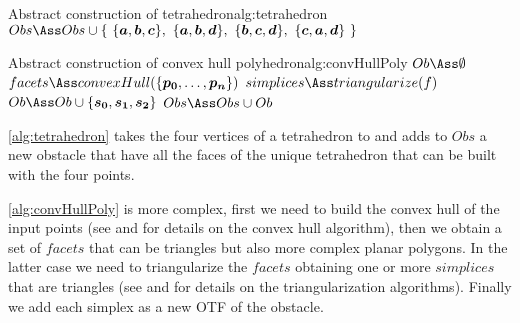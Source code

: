 \documentclass[dissertation.tex]{subfiles}
\begin{document}
\begin{algo}{Abstract construction of tetrahedron}{alg:tetrahedron}
  \State $Obs\Ass Obs\cup\{\ \{\ve{a},\ve{b},\ve{c}\},\ \{\ve{a},\ve{b},\ve{d}\},\ \{\ve{b},\ve{c},\ve{d}\},\ \{\ve{c},\ve{a},\ve{d}\}\ \}$
  \EndProcedure
\end{algo}
\begin{algo}{Abstract construction of convex hull
    polyhedron}{alg:convHullPoly}
  \State $Ob\Ass\emptyset$
  \State $facets\Ass convexHull(\{\ve{p_0},\dots,\ve{p_n}\})$
  \State $simplices\Ass triangularize(f)$
  \State $Ob\Ass Ob\cup\{\ve{s_0},\ve{s_1},\ve{s_2}\}$
  \EndFor
  \EndFor
  \State $Obs\Ass Obs\cup Ob$
  \EndProcedure
\end{algo}
\cref{alg:tetrahedron} takes the four vertices of a tetrahedron to
and adds to $Obs$ a new obstacle that have all the faces of the
unique tetrahedron that can be built with the four
points.

\cref{alg:convHullPoly} is more complex, first we need to build the
convex hull of the input points (see \cite{deberg} and \cite{press}
for details on the 
convex hull algorithm), then we obtain a set of $facets$ that can be
triangles but also more complex planar polygons. In the latter case we
need
to triangularize the $facets$ obtaining one or more $simplices$ that
are triangles (see \cite{deberg} and \cite{press} for details on the
triangularization
algorithms). Finally we add each simplex as a new \ac{OTF} of the
obstacle.
\end{document}
